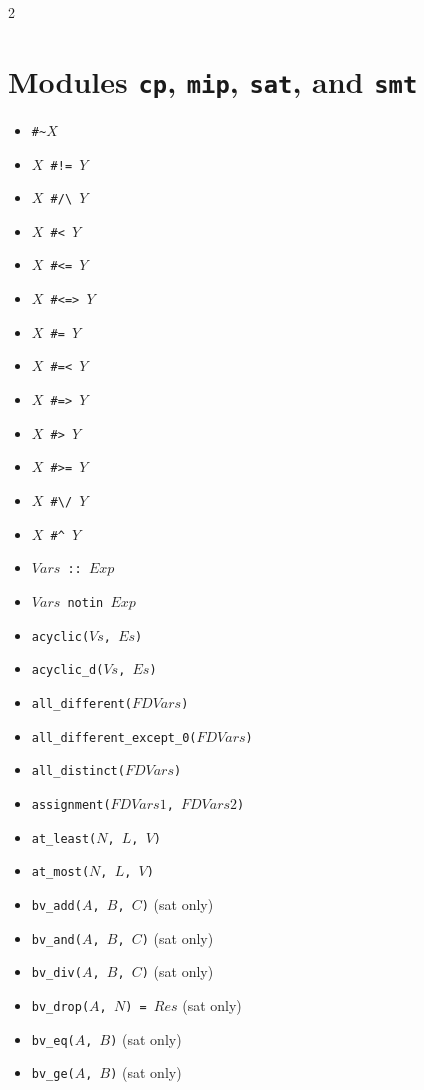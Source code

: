 \documentclass[10pt]{article}
\begin{document}
\begin{multicols}{2}
\section*{Modules \texttt{cp}, \texttt{mip}, \texttt{sat}, and \texttt{smt}}
\begin{scriptsize}
\begin{itemize}
    \item {\tt \verb+#~+$X$}
    \item {\tt $X$ \verb+#!=+ $Y$} 
    \item {\tt $X$ \verb+#/\+ $Y$}
    \item {\tt $X$ \verb+#<+ $Y$} 
    \item {\tt $X$ \verb+#<=+ $Y$}
    \item {\tt $X$ \verb+#<=>+ $Y$}
    \item {\tt $X$ \verb+#=+ $Y$} 
    \item {\tt $X$ \verb+#=<+ $Y$} 
    \item {\tt $X$ \verb+#=>+ $Y$}
    \item {\tt $X$ \verb+#>+ $Y$} 
    \item {\tt $X$ \verb+#>=+ $Y$} 
    \item {\tt $X$ \verb+#\/+ $Y$}
    \item {\tt $X$ \verb+#^+ $Y$}
\item \texttt{$Vars$ :: $Exp$}
\item \texttt{$Vars$ notin $Exp$}
\item \texttt{acyclic($Vs$, $Es$)}
\item \texttt{acyclic\_d($Vs$, $Es$)}
\item \texttt{all\_different($FDVars$)}
\item \texttt{all\_different\_except\_0($FDVars$)}
\item \texttt{all\_distinct($FDVars$)}
\item \texttt{assignment($FDVars1$, $FDVars2$)}
\item \texttt{at\_least($N$, $L$, $V$)}
\item \texttt{at\_most($N$, $L$, $V$)} 
\item \texttt{bv\_add($A$, $B$, $C$)} (sat only)
\item \texttt{bv\_and($A$, $B$, $C$)} (sat only)
\item \texttt{bv\_div($A$, $B$, $C$)} (sat only)
\item \texttt{bv\_drop($A$, $N$) = $Res$} (sat only)
\item \texttt{bv\_eq($A$, $B$)} (sat only)
\item \texttt{bv\_ge($A$, $B$)} (sat only)

\end{itemize}
\end{scriptsize}
\end{multicols}
\end{document}
